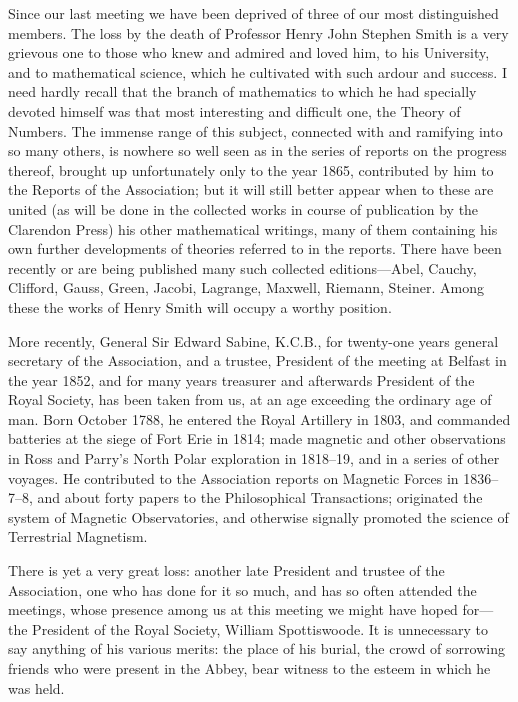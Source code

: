 \documentclass[11pt,a4paper]{article}
\begin{document}
Since our last meeting we have been deprived of three of our most
distinguished members. The loss by the death of Professor Henry John
Stephen Smith is a very grievous one to those who knew and admired and
loved him, to his University, and to mathematical science, which he
cultivated with such ardour and success. I need hardly recall that the
branch of mathematics to which he had specially devoted himself was that
most interesting and difficult one, the Theory of Numbers. The immense
range of this subject, connected with and ramifying into so many others,
is nowhere so well seen as in the series of reports on the progress
thereof, brought up unfortunately only to the year 1865, contributed by
him to the Reports of the Association; but it will still better appear
when to these are united (as will be done in the collected works in
course of publication by the Clarendon Press) his other mathematical
writings, many of them containing his own further developments of
theories referred to in the reports. There have been recently or are
being published many such collected editions---Abel, Cauchy, Clifford,
Gauss, Green, Jacobi, Lagrange, Maxwell, Riemann, Steiner. Among these
the works of Henry Smith will occupy a worthy position.

More recently, General Sir Edward Sabine, K.C.B., for twenty-one years
general secretary of the Association, and a trustee, President of the
meeting at Belfast in the year 1852, and for many years treasurer and
afterwards President of the Royal Society, has been taken from us, at an
age exceeding the ordinary age of man. Born October 1788, he entered the
Royal Artillery in 1803, and commanded batteries at the siege of Fort
Erie in 1814; made magnetic and other observations in Ross and Parry's
North Polar exploration in 1818--19, and in a series of other voyages. He
contributed to the Association reports on Magnetic Forces in 1836--7--8,
and about forty papers to the Philosophical Transactions; originated the
system of Magnetic Observatories, and otherwise signally promoted the
science of Terrestrial Magnetism.

There is yet a very great loss: another late President and trustee of the
Association, one who has done for it so much, and has so often attended
the meetings, whose presence among us at this meeting we might have
hoped for---the President of the Royal Society, William Spottiswoode. It
is unnecessary to say anything of his various merits: the place of his
burial, the crowd of sorrowing friends who were present in the Abbey,
bear witness to the esteem in which he was held.
\end{document}
